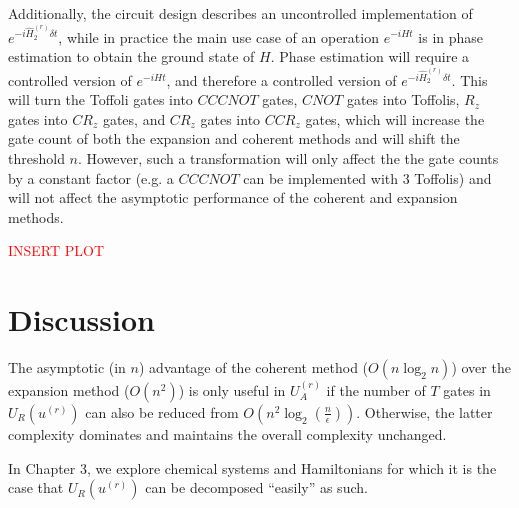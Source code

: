 Additionally, the circuit design describes an uncontrolled implementation of $e^{-i\hat{H}_2^{(r)}\delta t}$, while in practice the main use case of an operation $e^{-iHt}$ is in phase estimation to obtain the ground state of $H$. Phase estimation will require a controlled version of $e^{-iHt}$, and therefore a controlled version of $e^{-i\hat{H}_2^{(r)}\delta t}$. This will turn the Toffoli gates into $CCCNOT$ gates, $CNOT$ gates into Toffolis, $R_z$ gates into $CR_z$ gates, and $CR_z$ gates into $CCR_z$ gates, which will increase the gate count of both the expansion and coherent methods and will shift the threshold $n$. However, such a transformation will only affect the the gate counts by a constant factor (e.g. a $CCCNOT$ can be implemented with $3$ Toffolis) and will not affect the asymptotic performance of the coherent and expansion methods.

\textcolor{red}{INSERT PLOT}



\section{Discussion}

The asymptotic (in $n$) advantage of the coherent method ($O(n\log_2{n})$) over the expansion method ($O(n^2)$) is only useful in $U_A^{(r)}$ if the number of $T$ gates in $U_R(u^{(r)})$ can also be reduced from $O(n^2\log_2(\frac{n}{\epsilon}))$. Otherwise, the latter complexity dominates and maintains the overall complexity unchanged.

In Chapter 3, we explore chemical systems and Hamiltonians for which it is the case that $U_R(u^{(r)})$ can be decomposed ``easily'' as such.



